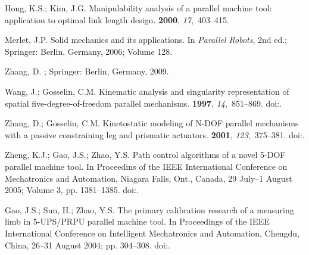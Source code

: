 \documentclass[robotics,article,accept,moreauthors,pdftex]{Definitions/mdpi}
\begin{document}
\begin{thebibliography}{999}
Hong, K.S.; Kim, J.G.
\newblock Manipulability analysis of a parallel machine tool: application to
  optimal link length design.
 {\bf 2000}, {\em 17},~403--415.

Merlet, J.P.
\newblock Solid mechanics and its applications. In {\em Parallel Robots}, 2nd ed.;  Springer: Berlin, Germany, 2006; Volume 128.

Zhang, D.
; Springer: Berlin, Germany, 2009.

Wang, J.; Gosselin, C.M.
\newblock Kinematic analysis and singularity representation of spatial
  five-degree-of-freedom parallel mechanisms.
 {\bf 1997}, {\em 14},~851--869.
\newblock
  doi:{\href{https://doi.org/10.1002/(SICI)1097-4563(199712)14:12<851::AID-ROB3>3.0.CO;2-T}{}}.

Zhang, D.; Gosselin, C.M.
\newblock Kinetostatic modeling of N-DOF parallel mechanisms with a passive
  constraining leg and prismatic actuators.
 {\bf 2001}, {\em 123},~375--381.
\newblock
  doi:{\href{https://doi.org/10.1115/1.1370976}{}}.

Zheng, K.J.; Gao, J.S.; Zhao, Y.S.
\newblock Path control algorithms of a novel 5-DOF parallel machine tool.
\newblock  In Proceedins of the IEEE International Conference on Mechatronics and Automation, Niagara Falls, Ont., Canada, 29 July--1 August 2005; Volume 3, pp. 1381--1385.
\newblock
  doi:{\href{https://doi.org/10.1109/ICMA.2005.1626755}{}}.

Gao, J.S.; Sun, H.; Zhao, Y.S.
\newblock The primary calibration research of a measuring limb in 5-UPS/PRPU
  parallel machine tool.
\newblock  In Proceedings of the IEEE International Conference on Intelligent Mechatronics and Automation, Chengdu, China, 26--31 August 2004; pp. 304--308.
\newblock
  doi:{\href{https://doi.org/10.1109/ICIMA.2004.1384209}{}}.


\end{thebibliography}
\end{document}
